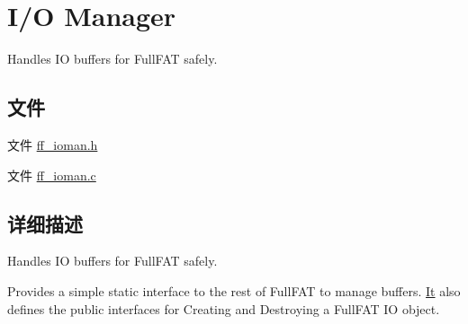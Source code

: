 \hypertarget{group___i_o_m_a_n}{}\section{I/O Manager}
\label{group___i_o_m_a_n}


Handles IO buffers for Full\+F\+AT safely.  


\subsection*{文件}
\begin{DoxyCompactItemize}
\item 
文件 \hyperlink{ff__ioman_8h}{ff\+\_\+ioman.\+h}
\item 
文件 \hyperlink{ff__ioman_8c}{ff\+\_\+ioman.\+c}
\end{DoxyCompactItemize}


\subsection{详细描述}
Handles IO buffers for Full\+F\+AT safely. 

Provides a simple static interface to the rest of Full\+F\+AT to manage buffers. \hyperlink{class_it}{It} also defines the public interfaces for Creating and Destroying a Full\+F\+AT IO object. 